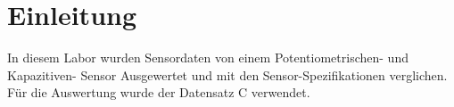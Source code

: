 \section{Einleitung}
In diesem Labor wurden Sensordaten von einem Potentiometrischen- und Kapazitiven-
Sensor Ausgewertet und mit den Sensor-Spezifikationen verglichen.\\
Für die Auswertung wurde der Datensatz C verwendet.
